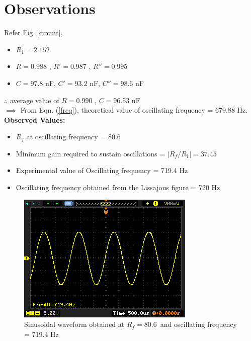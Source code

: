 \section{Observations}

Refer Fig. \ref{circuit},
\begin{itemize}
    \item $R_1 = 2.152$ \kohm
    \item $R = 0.988$ \kohm, $R' = 0.987$ \kohm, $R'' = 0.995$ \kohm
    \item $C = 97.8$ nF, $C' = 93.2$ nF, $C'' = 98.6$ nF
\end{itemize}

$\therefore$ average value of $R=0.990$ \kohm, $C=96.53$ nF\\
$\implies$ From Eqn. (\ref{freq}), theoretical value of oscillating frequency = 679.88 Hz.\\

\textbf{Observed Values:}

\begin{itemize}
    \item $R_f$ at oscillating frequency = 80.6 \kohm
    \item Minimum gain required to sustain oscillations = $|R_f/R_1| = 37.45$
    \item Experimental value of Oscillating frequency = 719.4 Hz
    \item Oscillating frequency obtained from the Lissajous figure = 720 Hz
\end{itemize}

\begin{figure}[H]
    \centering
    \includegraphics[width=0.8\columnwidth]{images/resonant.png}
    \caption{Sinusoidal waveform obtained at $R_f=80.6$ \kohm\,and oscillating frequency = 719.4 Hz}
    \label{res}
\end{figure}

